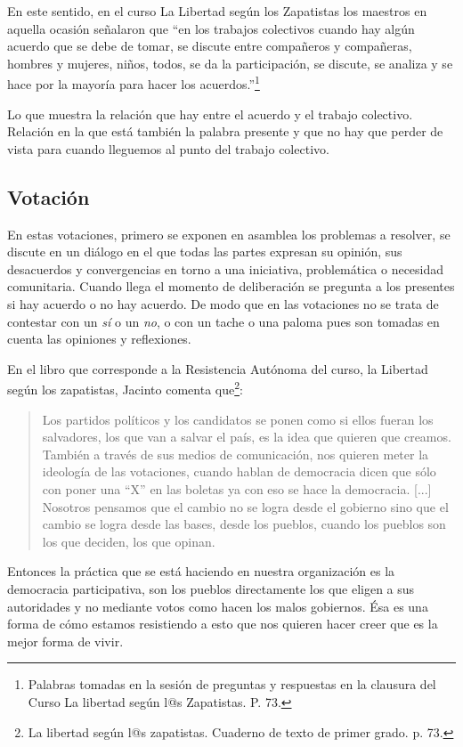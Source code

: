 \documentclass[oneside]{book}
\begin{document}
En este sentido, en el curso La Libertad según los Zapatistas los maestros en aquella ocasión señalaron que “en los trabajos colectivos cuando hay algún acuerdo que se debe de tomar, se discute entre compañeros y compañeras, hombres y mujeres, niños, todos, se da la participación, se discute, se analiza y se hace por la mayoría para hacer los acuerdos.”\footnote{Palabras tomadas en la sesión de preguntas y respuestas en la clausura del Curso La libertad según l@s Zapatistas. P. 73.}

Lo que muestra la relación que hay entre el acuerdo y el trabajo colectivo. Relación en la que está también la palabra presente y que no hay que perder de vista para cuando lleguemos al punto del trabajo colectivo.

\subsection{Votación}

En estas votaciones, primero se exponen en asamblea los problemas a resolver, se discute en un diálogo en el que todas las partes expresan su opinión, sus desacuerdos y convergencias en torno a una iniciativa, problemática o necesidad comunitaria. Cuando llega el momento de deliberación se pregunta a los presentes si hay acuerdo o no hay acuerdo. De modo que en las votaciones no se trata de contestar con un \textit{sí} o un \textit{no}, o con un tache o una paloma pues son tomadas en cuenta las opiniones y reflexiones.

En el libro que corresponde a la Resistencia Autónoma del curso, la Libertad según los zapatistas, Jacinto comenta que\footnote{La libertad según l@s zapatistas. Cuaderno de texto de primer grado. p. 73.}:
\begin{quote}
Los partidos políticos y los candidatos se ponen como si ellos fueran los salvadores, los que van a salvar el país, es la idea que quieren que creamos. También a través de sus medios de comunicación, nos quieren meter la ideología de las votaciones, cuando hablan de democracia dicen que sólo con poner una “X” en las boletas ya con eso se hace la democracia.
[...]
Nosotros pensamos que el cambio no se logra desde el gobierno sino que el cambio se logra desde las bases, desde los pueblos, cuando los pueblos son los que deciden, los que opinan.
\end{quote}
Entonces la práctica que se está haciendo en nuestra organización es la democracia participativa, son los pueblos directamente los que eligen a sus autoridades y no mediante votos como hacen los malos gobiernos. Ésa es una forma de cómo estamos resistiendo a esto que nos quieren hacer creer que es la mejor forma de vivir. 
\end{document}

